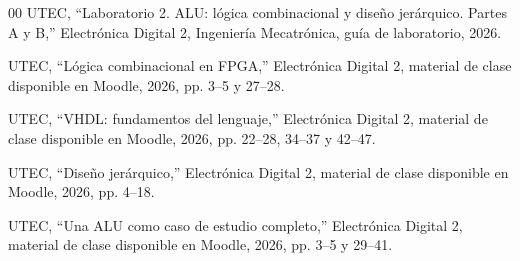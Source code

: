 \begin{thebibliography}{00}
 UTEC, ``Laboratorio 2. ALU: lógica combinacional
y diseño jerárquico. Partes A y B,'' Electrónica Digital 2,
Ingeniería Mecatrónica, guía de laboratorio, 2026.

 UTEC, ``Lógica combinacional en FPGA,''
Electrónica Digital 2, material de clase disponible en Moodle,
2026, pp. 3--5 y 27--28.

 UTEC, ``VHDL: fundamentos del lenguaje,''
Electrónica Digital 2, material de clase disponible en Moodle,
2026, pp. 22--28, 34--37 y 42--47.

 UTEC, ``Diseño jerárquico,'' Electrónica
Digital 2, material de clase disponible en Moodle, 2026,
pp. 4--18.

 UTEC, ``Una ALU como caso de estudio completo,''
Electrónica Digital 2, material de clase disponible en Moodle,
2026, pp. 3--5 y 29--41.
\end{thebibliography}
